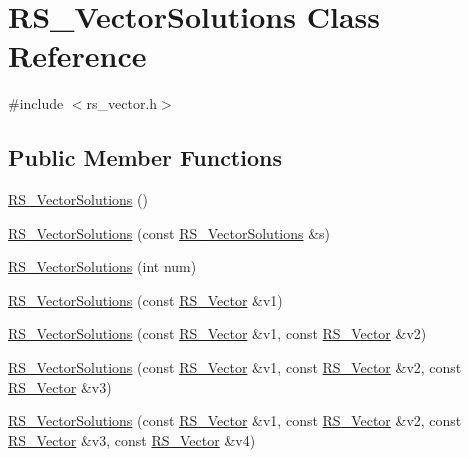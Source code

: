 \hypertarget{class_r_s___vector_solutions}{\section{R\-S\-\_\-\-Vector\-Solutions Class Reference}
\label{class_r_s___vector_solutions}
}


{\ttfamily \#include $<$rs\-\_\-vector.\-h$>$}

\subsection*{Public Member Functions}
\begin{DoxyCompactItemize}
\item 
\hyperlink{class_r_s___vector_solutions_a240f09023e199712f456b21bd0690944}{R\-S\-\_\-\-Vector\-Solutions} ()
\item 
\hyperlink{class_r_s___vector_solutions_a92d7fc857eea9c9ba96b63aefbb30268}{R\-S\-\_\-\-Vector\-Solutions} (const \hyperlink{class_r_s___vector_solutions}{R\-S\-\_\-\-Vector\-Solutions} \&s)
\item 
\hyperlink{class_r_s___vector_solutions_a416d9c4f0666aac9f31f6bab0ffa33d7}{R\-S\-\_\-\-Vector\-Solutions} (int num)
\item 
\hyperlink{class_r_s___vector_solutions_aeba70867266eb3b1bb8718f1e1f0ad81}{R\-S\-\_\-\-Vector\-Solutions} (const \hyperlink{class_r_s___vector}{R\-S\-\_\-\-Vector} \&v1)
\item 
\hyperlink{class_r_s___vector_solutions_a79631e3489c4a52b61922151a011f69e}{R\-S\-\_\-\-Vector\-Solutions} (const \hyperlink{class_r_s___vector}{R\-S\-\_\-\-Vector} \&v1, const \hyperlink{class_r_s___vector}{R\-S\-\_\-\-Vector} \&v2)
\item 
\hyperlink{class_r_s___vector_solutions_acdff387f45e63375cca5a862af1a62d2}{R\-S\-\_\-\-Vector\-Solutions} (const \hyperlink{class_r_s___vector}{R\-S\-\_\-\-Vector} \&v1, const \hyperlink{class_r_s___vector}{R\-S\-\_\-\-Vector} \&v2, const \hyperlink{class_r_s___vector}{R\-S\-\_\-\-Vector} \&v3)
\item 
\hyperlink{class_r_s___vector_solutions_a96231e5c0cba59f3cf2fc7144d8a15e1}{R\-S\-\_\-\-Vector\-Solutions} (const \hyperlink{class_r_s___vector}{R\-S\-\_\-\-Vector} \&v1, const \hyperlink{class_r_s___vector}{R\-S\-\_\-\-Vector} \&v2, const \hyperlink{class_r_s___vector}{R\-S\-\_\-\-Vector} \&v3, const \hyperlink{class_r_s___vector}{R\-S\-\_\-\-Vector} \&v4)
\item 

\end{DoxyCompactItemize}
